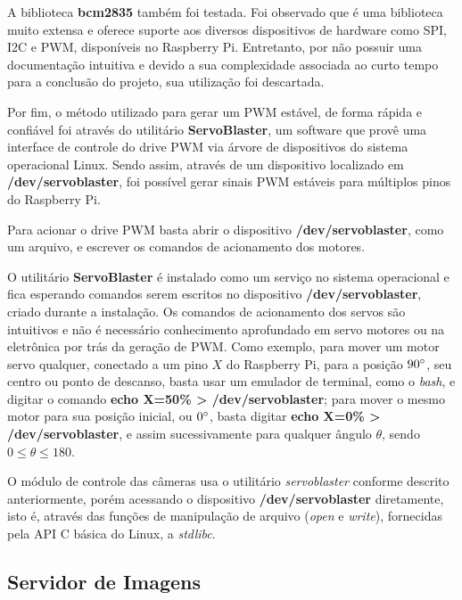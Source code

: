 A biblioteca \textbf{bcm2835} também foi testada. Foi observado que é uma biblioteca muito extensa e oferece suporte aos diversos dispositivos de hardware como SPI, I2C e PWM, disponíveis no Raspberry Pi. Entretanto, por não possuir uma documentação intuitiva e devido a sua complexidade associada ao curto tempo para a conclusão do projeto, sua utilização foi descartada.\par

Por fim, o método utilizado para gerar um PWM estável, de forma rápida e confiável foi através do utilitário \textbf{ServoBlaster}, um software que provê uma interface de controle do drive PWM via árvore de dispositivos do sistema operacional Linux. Sendo assim, através de um dispositivo localizado em \textbf{/dev/servoblaster}, foi possível gerar sinais PWM estáveis para múltiplos pinos do Raspberry Pi.\par 

Para acionar o drive PWM basta abrir o dispositivo \textbf{/dev/servoblaster}, como um arquivo, e escrever os comandos de acionamento dos motores.\par

O utilitário \textbf{ServoBlaster} é instalado como um serviço no sistema operacional e fica esperando comandos serem escritos no dispositivo \textbf{/dev/servoblaster}, criado durante a instalação. Os comandos de acionamento dos servos são intuitivos e não é necessário conhecimento aprofundado em servo motores ou na eletrônica por trás da geração de PWM. Como exemplo, para mover um motor servo qualquer, conectado a um pino $X$ do Raspberry Pi, para a posição $90\degree$, seu centro ou ponto de descanso, basta usar um emulador de terminal, como o \textit{bash}, e digitar o comando \textbf{echo X=50\% > /dev/servoblaster}; para mover o mesmo motor para sua posição inicial, ou $0\degree$, basta digitar \textbf{echo X=0\% > /dev/servoblaster}, e assim sucessivamente para qualquer ângulo $\theta$, sendo $0 \le \theta \le 180$.\par

O módulo de controle das câmeras usa o utilitário \textit{servoblaster} conforme descrito anteriormente, porém acessando o dispositivo \textbf{/dev/servoblaster} diretamente, isto é, através das funções de manipulação de arquivo (\textit{open} e \textit{write}), fornecidas pela API C básica do Linux, a \textit{stdlibc}.

\subsection{Servidor de Imagens}
\label{subsec:mediaserver}

